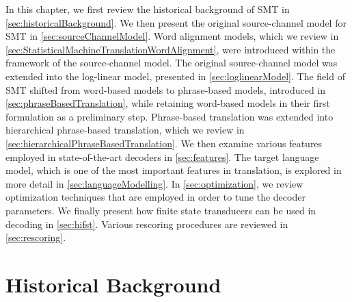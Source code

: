 In this chapter, we first review the historical background of SMT in
\autoref{sec:historicalBackground}.
We then present the original source-channel model for SMT
in \autoref{sec:sourceChannelModel}.
Word alignment models, which we review in
\autoref{sec:StatisticalMachineTranslationWordAlignment},
were introduced within the framework of the source-channel
model. The original source-channel model was extended into the log-linear
model, presented in \autoref{sec:loglinearModel}.
The field of SMT shifted from word-based models to phrase-based
models, introduced in \autoref{sec:phraseBasedTranslation}, while
retaining word-based models in their first formulation as a preliminary step.
Phrase-based translation was extended into hierarchical
phrase-based translation, which we review in
\autoref{sec:hierarchicalPhraseBasedTranslation}.
We then
examine various features employed in state-of-the-art decoders in
\autoref{sec:features}. The target language model, which
is one of the most important features in translation, is explored in
more detail in \autoref{sec:languageModelling}. In
\autoref{sec:optimization}, we review optimization techniques that
are employed in order to tune the decoder parameters. We finally present
how finite state transducers can be used in decoding
in \autoref{sec:hifst}. Various rescoring
procedures are reviewed in \autoref{sec:rescoring}.


\section{Historical Background}
\label{sec:historicalBackground}


